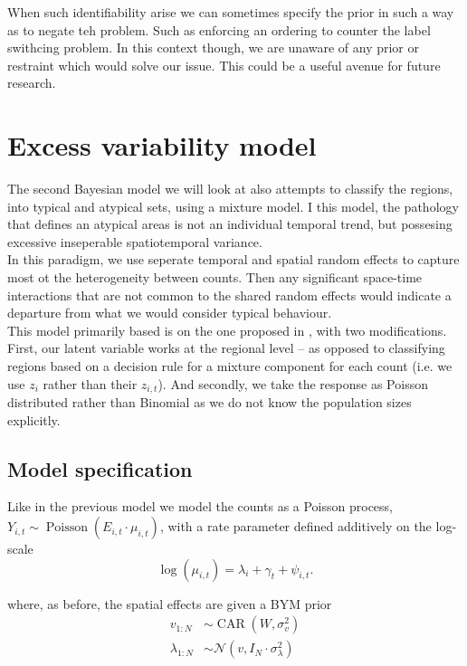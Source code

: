 \documentclass[11pt]{report}
\begin{document}
When such identifiability arise we can sometimes specify the prior in such a way as to negate teh problem. Such as enforcing an ordering to counter the label swithcing problem. In this context though, we are unaware of any prior or restraint which would solve our issue. This could be a useful avenue for future research.

\chapter{Excess variability model}

The second Bayesian model we will look at also attempts to classify the regions, into typical and atypical sets, using a mixture model. I this model, the pathology that defines an atypical areas is not an individual temporal trend, but possesing excessive inseperable spatiotemporal variance. \\

In this paradigm, we use seperate temporal and spatial random effects to capture most ot the heterogeneity between counts. Then any significant space-time interactions that are not common to the shared random effects would indicate a departure from what we would consider typical behaviour. \\

This model primarily based is on the one proposed in \citet{stability}, with two modifications. First, our latent variable works at the regional level -- as opposed to classifying regions based on a decision rule for a mixture component for each count (i.e. we use $z_{i}$ rather than their $z_{i,t}$). And secondly, we take the response as Poisson distributed rather than Binomial as we do not know the population sizes explicitly.

\section{Model specification}

Like in the previous model we model the counts as a Poisson process, $Y_{i,t} \sim \operatorname{Poisson}(E_{i,t} \cdot \mu_{i,t})$, with a rate parameter defined additively on the log-scale
\begin{equation}
\log(\mu_{i,t}) = \lambda_i + \gamma_t + \psi_{i,t}.
\end{equation}

where, as before, the spatial effects are given a BYM prior
\begin{align*}
v_{1:N} &\sim \operatorname{CAR}(W, \sigma_v^2) \\
\lambda_{1:N} &\sim \mathcal{N}(v, I_N \cdot \sigma_\lambda^2) \\
\end{align*}
\end{document}
